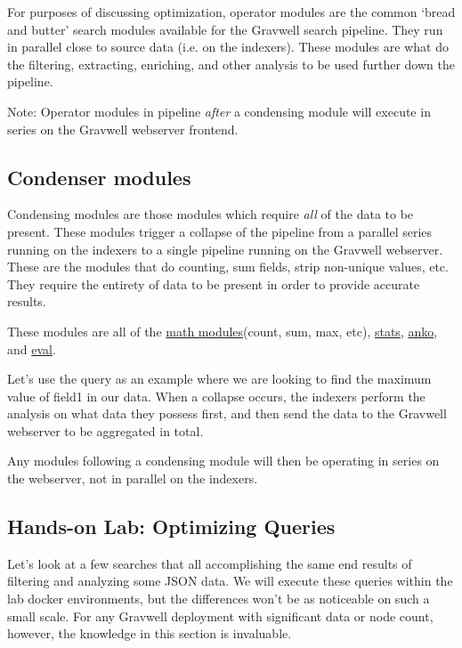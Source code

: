 For purposes of discussing optimization, operator modules are the
common `bread and butter' search modules available for the Gravwell
search pipeline. They run in parallel close to source data (i.e. on
the indexers). These modules are what do the filtering, extracting,
enriching, and other analysis to be used further down the pipeline.

Note: Operator modules in pipeline \emph{after} a condensing module will
execute in series on the Gravwell webserver frontend.

\subsection{Condenser modules}

Condensing modules are those modules which require \emph{all} of the data to
be present. These modules trigger a collapse of the pipeline from a
parallel series running on the indexers to a single pipeline running on
the Gravwell webserver. These are the modules that do counting, sum
fields, strip non-unique values, etc. They require the entirety of data
to be present in order to provide accurate results.

These modules are all of the \href{https://docs.gravwell.io/\#!search/math/math.md}{math
modules}(count, sum, max, etc),
\href{https://docs.gravwell.io/\#!search/stats/stats.md}{stats},
\href{https://docs.gravwell.io/\#!search/anko/anko.md}{anko}, and
\href{https://docs.gravwell.io/\#!search/eval/eval.md}{eval}.

Let's use the query  as an
example where we are looking to find the maximum value of field1 in our
data. When a collapse occurs, the indexers perform the analysis on what
data they possess first, and then send the data to the Gravwell
webserver to be aggregated in total.

Any modules following a condensing module will then be operating in
series on the webserver, not in parallel on the indexers.

\clearpage
\subsection{Hands-on Lab: Optimizing Queries}

Let's look at a few searches that all accomplishing the same end
results of filtering and analyzing some JSON data. We will execute these
queries within the lab docker environments, but the differences won't be
as noticeable on such a small scale. For any Gravwell deployment with
significant data or node count, however, the knowledge in this section
is invaluable.

